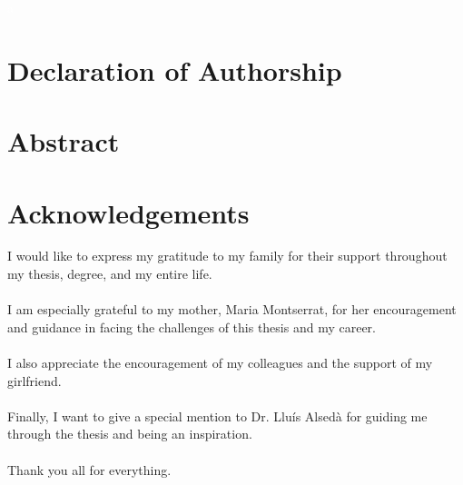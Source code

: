 \documentclass[a4paper, 11pt]{article}
\begin{document}
\justifying
\newpage
\textcolor{white}{a}
\newpage 

\section*{Declaration of Authorship}
\newpage
{}
\section*{Abstract}
\newpage
{}
\section*{Acknowledgements}
I would like to express my gratitude to my family for their support throughout my thesis, degree, and my entire life.\\\\
I am especially grateful to my mother, Maria Montserrat, for her encouragement and guidance in facing the challenges of this thesis and my career.\\\\
I also appreciate the encouragement of my colleagues and the support of my girlfriend.\\\\
Finally, I want to give a special mention to Dr. Lluís Alsedà for guiding me through the thesis and being an inspiration.\\\\
Thank you all for everything. 
\newpage

\tableofcontents
\cleardoublepage
{}


\newpage
{}
\end{document}
